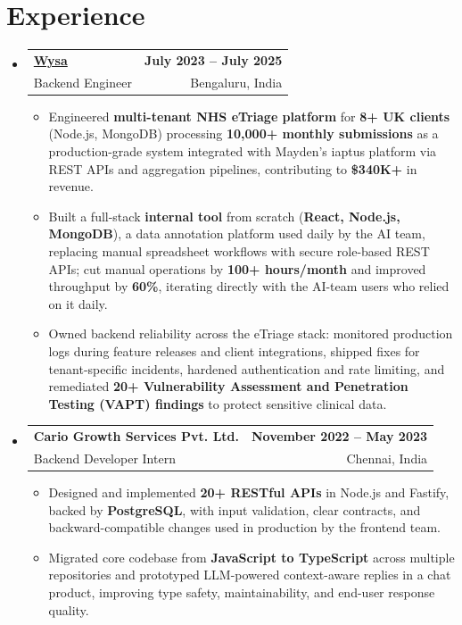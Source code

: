 \documentclass[letterpaper,10pt]{article}
\makeatletter
\newcommand{\resumeItem}[1]{
  \item\small{#1\vspace{-1pt}}
}
\newcommand{\resumeSubheading}[4]{
  \vspace{1pt}\item
    \begin{tabular*}{0.985\textwidth}[t]{l@{\extracolsep{\fill}}r}
      \textbf{#1} & \textbf{\small #2} \\
      {\small\color{ResumeSlate} #3} & {\small\color{ResumeSlate} #4} \\
    \end{tabular*}\vspace{-6pt}
}
\newcommand{\resumeSubHeadingListStart}{\begin{itemize}[leftmargin=0.0in, label={}, itemsep=2pt, topsep=2pt]}
\newcommand{\resumeSubHeadingListEnd}{\end{itemize}}
\newcommand{\resumeItemListStart}{\begin{itemize}[leftmargin=0.18in, itemsep=2pt, topsep=1pt]}
\newcommand{\resumeItemListEnd}{\end{itemize}\vspace{-4pt}}
\makeatother
\begin{document}
\section{Experience}
\resumeSubHeadingListStart
  \resumeSubheading
    {\href{https://www.wysa.io}{Wysa}}{July 2023 -- July 2025}
    {Backend Engineer}{Bengaluru, India}
    \resumeItemListStart
      \resumeItem{Engineered \textbf{multi-tenant NHS eTriage platform} for \textbf{8+ UK clients} (Node.js, MongoDB) processing \textbf{10{,}000+ monthly submissions} as a production-grade system integrated with Mayden's iaptus platform via REST APIs and aggregation pipelines, contributing to \textbf{\$340K+} in revenue.}
      \resumeItem{Built a full-stack \textbf{internal tool} from scratch (\textbf{React, Node.js, MongoDB}), a data annotation platform used daily by the AI team, replacing manual spreadsheet workflows with secure role-based REST APIs; cut manual operations by \textbf{100+ hours/month} and improved throughput by \textbf{60\%}, iterating directly with the AI-team users who relied on it daily.}
      \resumeItem{Owned backend reliability across the eTriage stack: monitored production logs during feature releases and client integrations, shipped fixes for tenant-specific incidents, hardened authentication and rate limiting, and remediated \textbf{20+ Vulnerability Assessment and Penetration Testing (VAPT) findings} to protect sensitive clinical data.}
    \resumeItemListEnd
  \resumeSubheading
    {Cario Growth Services Pvt. Ltd.}{November 2022 -- May 2023}
    {Backend Developer Intern}{Chennai, India}
    \resumeItemListStart
      \resumeItem{Designed and implemented \textbf{20+ RESTful APIs} in Node.js and Fastify, backed by \textbf{PostgreSQL}, with input validation, clear contracts, and backward-compatible changes used in production by the frontend team.}
      \resumeItem{Migrated core codebase from \textbf{JavaScript to TypeScript} across multiple repositories and prototyped LLM-powered context-aware replies in a chat product, improving type safety, maintainability, and end-user response quality.}
    \resumeItemListEnd
\resumeSubHeadingListEnd
\vspace{-4pt}
\end{document}
